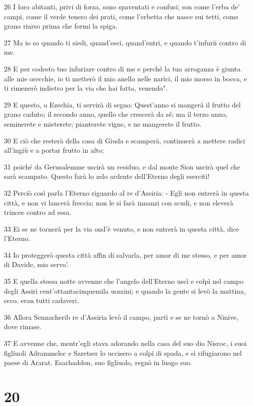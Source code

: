 \par 26 I loro abitanti, privi di forza, sono spaventati e confusi; son come l'erba de' campi, come il verde tenero dei prati, come l'erbetta che nasce sui tetti, come grano riarso prima che formi la spiga.
\par 27 Ma io so quando ti siedi, quand'esci, quand'entri, e quando t'infurii contro di me.
\par 28 E per codesto tuo infuriare contro di me e perché la tua arroganza è giunta alle mie orecchie, io ti metterò il mio anello nelle narici, il mio morso in bocca, e ti rimenerò indietro per la via che hai fatta, venendo".
\par 29 E questo, o Ezechia, ti servirà di segno: Quest'anno si mangerà il frutto del grano caduto; il secondo anno, quello che crescerà da sé; ma il terzo anno, seminerete e mieterete; pianterete vigne, e ne mangerete il frutto.
\par 30 E ciò che resterà della casa di Giuda e scamperà, continuerà a mettere radici all'ingiù e a portar frutto in alto;
\par 31 poiché da Gerusalemme uscirà un residuo, e dal monte Sion uscirà quel che sarà scampato. Questo farà lo zelo ardente dell'Eterno degli eserciti!
\par 32 Perciò così parla l'Eterno riguardo al re d'Assiria: - Egli non entrerà in questa città, e non vi lancerà freccia; non le si farà innanzi con scudi, e non eleverà trincee contro ad essa.
\par 33 Ei se ne tornerà per la via ond'è venuto, e non entrerà in questa città, dice l'Eterno.
\par 34 Io proteggerò questa città affin di salvarla, per amor di me stesso, e per amor di Davide, mio servo'.
\par 35 E quella stessa notte avvenne che l'angelo dell'Eterno uscì e colpì nel campo degli Assiri cent'ottantacinquemila uomini; e quando la gente si levò la mattina, ecco, eran tutti cadaveri.
\par 36 Allora Sennacherib re d'Assiria levò il campo, partì e se ne tornò a Ninive, dove rimase.
\par 37 E avvenne che, mentr'egli stava adorando nella casa del suo dio Nisroc, i suoi figliuoli Adrammelec e Saretser lo uccisero a colpi di spada, e si rifugiarono nel paese di Ararat. Esarhaddon, suo figliuolo, regnò in luogo suo.

\chapter{20}

